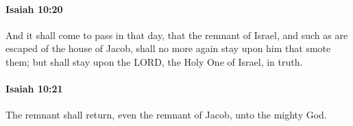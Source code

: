 		\paragraph{Isaiah 10:20} %
			\label{ISAIAH-10-20}

			And it shall come to pass in that day, that the remnant of Israel, and such as are escaped of the house of Jacob, shall no more again stay upon him that smote them; but shall stay upon the LORD, the Holy One of Israel, in truth.


		\paragraph{Isaiah 10:21} %
			\label{ISAIAH-10-21}

			The remnant shall return, even the remnant of Jacob, unto the mighty God.


